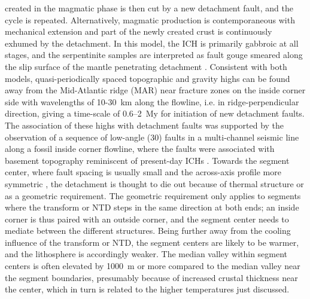 \documentclass[jgr]{agu2001}
\newlength{\tw}
\begin{document}
\begin{article}
created in the magmatic phase is then cut by a new detachment fault,
and the cycle is repeated.  Alternatively,
magmatic production is contemporaneous with mechanical extension and part
of the newly created crust is continuously exhumed by the
detachment. In this model, the ICH is primarily gabbroic at all
stages, and the serpentinite samples are interpreted as fault gouge
smeared along the slip surface of the mantle penetrating detachment \citep{reston02}.
Consistent with both models, quasi-periodically spaced topographic and
gravity highs can be
found away from the Mid-Atlantic ridge  (MAR) near fracture zones on the
inside corner side with wavelengths of 10-30~km along the flowline, i.e. in
ridge-perpendicular direction, giving a time-scale of 0.6--2~My for initiation of new detachment faults.  The
association of these highs with detachment faults was supported by the
observation of a sequence of low-angle (30\dg) faults in a multi-channel seismic
line along a fossil inside corner flowline, where the faults were
associated with basement topography reminiscent of
present-day ICHs \citep{ranero99}. 
Towards the segment center, where fault spacing is usually small and
the across-axis profile more symmetric \citep{shaw93}, the
detachment is thought to die out because of thermal structure or as a
geometric requirement.  The geometric requirement only applies to
segments where the transform or NTD steps in the same direction at
both ends; an inside corner is thus paired with an outside corner, and
the segment center needs to mediate between the different structures.
Being further away from the cooling influence of the transform or NTD,
the segment centers are likely to be warmer, and the lithosphere is
accordingly weaker.  The median valley within segment centers is often
elevated by 1000~m or more compared to the median valley near the
segment boundaries, presumably because of increased
crustal thickness near the center,
which in turn is related to the  higher temperatures just discussed.


\end{article}
\end{document}
